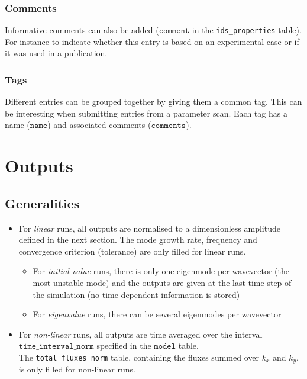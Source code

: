 \documentclass[a4paper]{report}
\begin{document}
\subsection{Comments} \label{sec:comments}
Informative comments can also be added  ($\texttt{comment}$ in the \texttt{ids\_properties} table). For instance to indicate whether this entry is based on an experimental case or if it was used in a publication.

\subsection{Tags} \label{sec:tags}
Different entries can be grouped together by giving them a common tag. This can be interesting when submitting entries from a parameter scan. Each tag has a name ($\texttt{name}$) and associated comments ($\texttt{comments}$).
 

\chapter{Outputs}

\section{Generalities}
\begin{itemize}
 \item For \textit{linear} runs, all outputs are normalised to a dimensionless amplitude defined in the next section.  The mode growth rate, frequency and convergence criterion (tolerance) are only filled for linear runs.
  \begin{itemize}
   \item For \textit{initial value} runs, there is only one eigenmode per wavevector (the most unstable mode) and the outputs are given at the last time step of the simulation (no time dependent information is stored)
   \item For \textit{eigenvalue} runs, there can be several eigenmodes per wavevector
  \end{itemize}	  
 \item For \textit{non-linear} runs, all outputs are time averaged over the interval $\texttt{time\_interval\_norm}$ specified in the $\texttt{model}$ table.\\ 
 The \texttt{total\_fluxes\_norm} table, containing the fluxes summed over $k_x$ and $k_y$, is only filled for non-linear runs.
\end{itemize}
\end{document}
